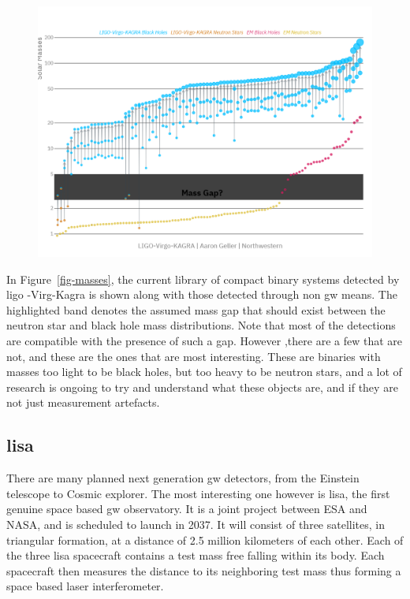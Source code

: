 \documentclass[
  10pt,
  a4paper,
  DIV=11,
  numbers=noendperiod,
  twoside]{scrreprt}
\DeclareRobustCommand{\[}{\begin{equation}}
\DeclareRobustCommand{\]}{\end{equation}}
\begin{document}
\begin{figure}


{\centering \includegraphics{./Masses_of_Dead_Stars_LIGO_Virgo_KAGRA.png}

}

\end{figure}

In Figure~\ref{fig-masses}, the current library of compact binary
systems detected by \gls{ligo} -Virg-Kagra is shown along with those
detected through non \gls{gw} means. The highlighted band denotes the
assumed mass gap that should exist between the neutron star and black
hole mass distributions. Note that most of the detections are compatible
with the presence of such a gap. However ,there are a few that are not,
and these are the ones that are most interesting. These are binaries
with masses too light to be black holes, but too heavy to be neutron
stars, and a lot of research is ongoing to try and understand what these
objects are, and if they are not just measurement artefacts.

\hypertarget{lisa}{%
\subsection{\texorpdfstring{\gls{lisa}}{}}\label{lisa}}

There are many planned next generation \gls{gw} detectors, from the
Einstein telescope to Cosmic explorer. The most interesting one however
is \gls{lisa}, the first genuine space based \gls{gw} observatory. It is
a joint project between ESA and NASA, and is scheduled to launch in
2037. It will consist of three satellites, in triangular formation, at a
distance of 2.5 million kilometers of each other. Each of the three
\gls{lisa} spacecraft contains a test mass free falling within its body.
Each spacecraft then measures the distance to its neighboring test mass
thus forming a space based laser interferometer.
\end{document}
